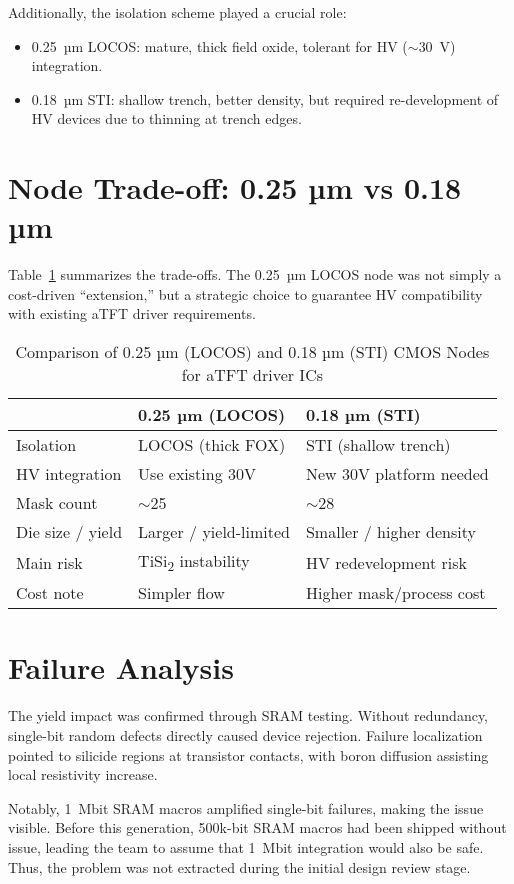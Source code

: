 \documentclass[conference]{IEEEtran}
\begin{document}
Additionally, the isolation scheme played a crucial role:
\begin{itemize}
    \item 0.25~µm LOCOS: mature, thick field oxide, tolerant for HV ($\sim$30~V) integration.
    \item 0.18~µm STI: shallow trench, better density, but required re-development of HV devices due to thinning at trench edges.
\end{itemize}

\section{Node Trade-off: 0.25 µm vs 0.18 µm}
Table~\ref{tab:comparison} summarizes the trade-offs.  
The 0.25~µm LOCOS node was not simply a cost-driven ``extension,'' but a strategic choice to guarantee HV compatibility with existing aTFT driver requirements.

\begin{table}[!t]
\centering
\caption{Comparison of 0.25 µm (LOCOS) and 0.18 µm (STI) CMOS Nodes for aTFT driver ICs}
\label{tab:comparison}
\begin{tabular}{@{}lll@{}}
\toprule
 & \textbf{0.25 µm (LOCOS)} & \textbf{0.18 µm (STI)} \\
\midrule
Isolation & LOCOS (thick FOX) & STI (shallow trench) \\
HV integration & Use existing 30V & New 30V platform needed \\
Mask count & $\sim$25 & $\sim$28 \\
Die size / yield & Larger / yield-limited & Smaller / higher density \\
Main risk & TiSi\textsubscript{2} instability & HV redevelopment risk \\
Cost note & Simpler flow & Higher mask/process cost \\
\bottomrule
\end{tabular}
\end{table}

\section{Failure Analysis}
The yield impact was confirmed through SRAM testing. 
Without redundancy, single-bit random defects directly caused device rejection. 
Failure localization pointed to silicide regions at transistor contacts, with boron diffusion assisting local resistivity increase.

Notably, 1~Mbit SRAM macros amplified single-bit failures, making the issue visible.  
Before this generation, 500k-bit SRAM macros had been shipped without issue, leading the team to assume that 1~Mbit integration would also be safe.  
Thus, the problem was not extracted during the initial design review stage.
\end{document}
